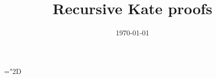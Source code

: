 \documentclass[11pt]{article}
\title{%
Recursive Kate proofs}
\date{\today}
\author{}
\numberwithin{figure}{section} %
\newcommand{\set}[1]{\ensuremath{\left\{#1\right\}}\xspace}
\begin{document}
\maketitle
 \mathchardef\mhyphen="2D

\newcommand{\G}{\ensuremath{{\mathbb G}}\xspace}
\renewcommand{\H}{\ensuremath{{\mathbb H}}\xspace}

\newcommand{\Gstar}{\ensuremath{{\mathbb G}^*}\xspace}

\newcommand{\grouppair}{\ensuremath{G^*}\xspace}

\newcommand{\Gt}{\ensuremath{{\mathbb G}_t}\xspace}
\newcommand{\F}{\ensuremath{{\mathbb F}_q}\xspace}
\newcommand{\Fstar}{\ensuremath{\mathbb F^*}\xspace}

\newcommand{\help}[1]{$#1$-helper\xspace}
\newcommand{\randompair}[1]{\ensuremath{\mathsf{randomPair}(#1)}\xspace}
\newcommand{\pair}[1]{$#1$-pair\xspace}
\newcommand{\pairs}[1]{$#1$-pairs\xspace}

\newcommand{\pairone}[1]{\G1-$#1$-pair\xspace}
\newcommand{\pairtwo}[1]{\G2-$#1$-pair\xspace}
\newcommand{\sameratio}[2]{\ensuremath{\mathsf{SameRatio}(#1,#2)}\xspace}
\newcommand{\vecc}[2]{\ensuremath{(#1)_{#2}}\xspace}
\newcommand{\players}{\ensuremath{[n]}\xspace}
\newcommand{\adv}{\ensuremath{\mathcal A}\xspace}
\newcommand{\advprime}{\ensuremath{A'}\xspace}
\newcommand{\extprime}{\ensuremath{E'}\xspace}
\newcommand{\advrand}{\ensuremath{\mathsf{rand}_{\adv}}\xspace}

\newcommand{\ci}{\ensuremath{\mathrm{CI}}\xspace}
\newcommand{\pairvec}[1]{$#1$-vector\xspace}
\newcommand{\Fq}{\ensuremath{\mathbb{F}_q}\xspace}
\newcommand{\Fr}{\ensuremath{\mathbb{F}_r}\xspace}
\newcommand{\randpair}[1]{\ensuremath{\mathsf{rp}_{#1}}\xspace}
\newcommand{\randpairone}[1]{\ensuremath{\mathsf{rp}_{#1}^{1}}\xspace}
\newcommand{\abase}{\ensuremath{A_{\mathrm{\mathbf{0}}}}\xspace}
\newcommand{\bbase}{\ensuremath{B_{\mathrm{\mathbf{0}}}}\xspace}
\newcommand{\cbase}{\ensuremath{C_{\mathrm{\mathbf{0}}}}\xspace}

\newcommand{\amid}{\ensuremath{A_{\mathrm{mid}}}\xspace}
\newcommand{\bmid}{\ensuremath{B_{\mathrm{mid}}}\xspace}
\newcommand{\cmid}{\ensuremath{C_{\mathrm{mid}}}\xspace}

\newcommand{\negl}{\ensuremath{\mathsf{negl}(\lambda)}\xspace}
\newcommand{\randpairtwo}[1]{\ensuremath{\mathsf{rp_{#1}^2}}\xspace}%
\newcommand{\nilp}{\ensuremath{\mathscr N}\xspace}
\newcommand{\snark}{\ensuremath{\mathscr S}\xspace}
\newcommand{\groupgen}{\ensuremath{\mathscr G}\xspace}
\newcommand{\qap}{\ensuremath{\mathscr Q}\xspace}
\end{document}
